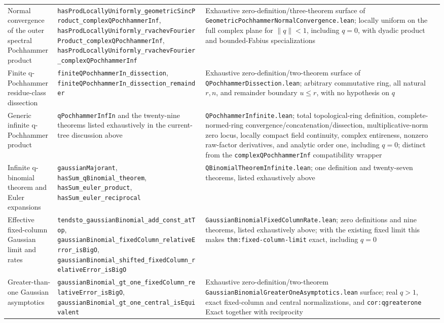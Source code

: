 \documentclass[11pt,oneside]{article}
\theoremstyle{definition}
\theoremstyle{remark}
\begin{document}
\begin{longtable}{@{}>{\raggedright\arraybackslash}p{} >{\raggedright\arraybackslash}p{} >{\raggedright\arraybackslash}p{}@{}}
Normal convergence of the outer spectral Pochhammer product & \nolinkurl{hasProdLocallyUniformly_geometricSincProduct_complexQPochhammerInf}, \nolinkurl{hasProdLocallyUniformly_rvachevFourierProduct_complexQPochhammerInf}, \nolinkurl{hasProdLocallyUniformly_rvachevFourier_complexQPochhammerInf} & Exhaustive zero-definition/three-theorem surface of \nolinkurl{GeometricPochhammerNormalConvergence.lean}; locally uniform on the full complex plane for \(\lVert q\rVert<1\), including \(q=0\), with dyadic product and bounded-Fabius specializations \\
Finite q-Pochhammer residue-class dissection & \nolinkurl{finiteQPochhammerIn_dissection}, \nolinkurl{finiteQPochhammerIn_dissection_remainder} & Exhaustive zero-definition/two-theorem surface of \nolinkurl{QPochhammerDissection.lean}; arbitrary commutative ring, all natural \(r,n\), and remainder boundary \(u\le r\), with no hypothesis on \(q\) \\
Generic infinite q-Pochhammer product & \nolinkurl{qPochhammerInfIn} and the twenty-nine theorems listed exhaustively in the current-tree discussion above & \nolinkurl{QPochhammerInfinite.lean}; total topological-ring definition, complete-normed-ring convergence/concatenation/dissection, multiplicative-norm zero locus, locally compact field continuity, complex entireness, nonzero raw-factor derivatives, and analytic order one, including \(q=0\); distinct from the \nolinkurl{complexQPochhammerInf} compatibility wrapper \\
Infinite q-binomial theorem and Euler expansions & \nolinkurl{gaussianMajorant}, \nolinkurl{hasSum_qBinomial_theorem}, \nolinkurl{hasSum_euler_product}, \nolinkurl{hasSum_euler_reciprocal} & \nolinkurl{QBinomialTheoremInfinite.lean}; one definition and twenty-seven theorems, listed exhaustively above \\
Effective fixed-column Gaussian limit and rates & \nolinkurl{tendsto_gaussianBinomial_add_const_atTop}, \nolinkurl{gaussianBinomial_fixedColumn_relativeError_isBigO}, \nolinkurl{gaussianBinomial_shifted_fixedColumn_relativeError_isBigO} & \nolinkurl{GaussianBinomialFixedColumnRate.lean}; zero definitions and nine theorems, listed exhaustively above; with the existing fixed limit this makes \nolinkurl{thm:fixed-column-limit} exact, including \(q=0\) \\
Greater-than-one Gaussian asymptotics & \nolinkurl{gaussianBinomial_gt_one_fixedColumn_relativeError_isBigO}, \nolinkurl{gaussianBinomial_gt_one_central_isEquivalent} & Exhaustive zero-definition/two-theorem \nolinkurl{GaussianBinomialGreaterOneAsymptotics.lean} surface; real \(q>1\), exact fixed-column and central normalizations, and \nolinkurl{cor:qgreaterone} Exact together with reciprocity \\

\end{longtable}
\end{document}
